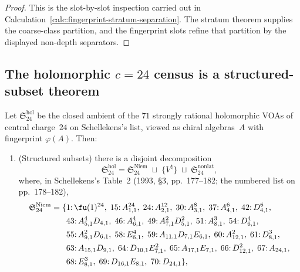 \begin{proof}
This is the slot-by-slot inspection carried out in
Calculation~\ref{calc:fingerprint-stratum-separation}. The stratum
theorem supplies the coarse-class partition, and the fingerprint
slots refine that partition by the displayed non-depth separators.
\end{proof}

\subsection{The holomorphic \texorpdfstring{$c=24$}{c=24} census is a
structured-subset theorem}
\label{subsec:schellekens-structured-subset}

\begin{theorem}[Structured-subset derivation of the holomorphic
\texorpdfstring{$c=24$}{c=24} census; closes AP\textup{290}]
\label{thm:schellekens-structured-subset}
\ClaimStatusProvedHere
Let $\mathfrak{S}_{24}^{\mathrm{hol}}$ be the closed ambient of the
$71$ strongly rational holomorphic VOAs of central charge~$24$ on
Schellekens's list, viewed as chiral algebras~$A$ with fingerprint
$\varphi(A)$. Then:
\begin{enumerate}[label=\textup{(\roman*)},leftmargin=*]
\item \textup{(}Structured subsets\textup{)}
 there is a disjoint decomposition
 \[
 \mathfrak{S}_{24}^{\mathrm{hol}}
 =
 \mathfrak{S}_{24}^{\mathrm{Niem}}
 \;\sqcup\;
 \{V^\natural\}
 \;\sqcup\;
 \mathfrak{S}_{24}^{\mathrm{nonlat}},
 \]
 where, in Schellekens's Table~2 \textup{(}1993, §3, pp.~177--182; the
 numbered list on pp.~178--182\textup{)},
 \[
 \begin{aligned}
 \mathfrak{S}_{24}^{\mathrm{Niem}}
 = \{&
 1{:}\,\fu(1)^{24},\;
 15{:}\,A_{1,1}^{24},\;
 24{:}\,A_{2,1}^{12},\;
 30{:}\,A_{3,1}^{8},\;
 37{:}\,A_{4,1}^{6},\;
 42{:}\,D_{4,1}^{6},\\
 &
 43{:}\,A_{5,1}^{4}D_{4,1},\;
 46{:}\,A_{6,1}^{4},\;
 49{:}\,A_{7,1}^{2}D_{5,1}^{2},\;
 51{:}\,A_{8,1}^{3},\;
 54{:}\,D_{6,1}^{4},\\
 &
 55{:}\,A_{9,1}^{2}D_{6,1},\;
 58{:}\,E_{6,1}^{4},\;
 59{:}\,A_{11,1}D_{7,1}E_{6,1},\;
 60{:}\,A_{12,1}^{2},\;
 61{:}\,D_{8,1}^{3},\\
 &
 63{:}\,A_{15,1}D_{9,1},\;
 64{:}\,D_{10,1}E_{7,1}^{2},\;
 65{:}\,A_{17,1}E_{7,1},\;
 66{:}\,D_{12,1}^{2},\;
 67{:}\,A_{24,1},\\
 &
 68{:}\,E_{8,1}^{3},\;
 69{:}\,D_{16,1}E_{8,1},\;
 70{:}\,D_{24,1}\},
 \end{aligned}
\]
\end{enumerate}
\end{theorem}
